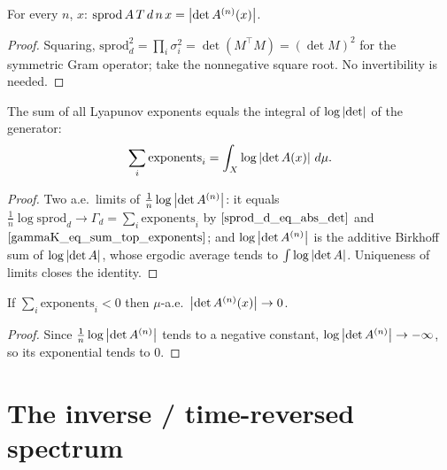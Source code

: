 \begin{lemma}\label{sprod_d_eq_abs_det}
  \leanok
  For every $n$, $x$: $\mathrm{sprod}\,A\,T\,d\,n\,x = \left\lvert \det A^{(n)}(x) \right\rvert$.
\end{lemma}
\begin{proof}\leanok
  Squaring, $\mathrm{sprod}_d^2 = \prod_i \sigma_i^2 = \det(M^{\top} M) = (\det M)^2$ for the symmetric Gram operator; take the nonnegative square root. No invertibility is needed.
\end{proof}

\begin{theorem}\label{sumAllExp_eq_integral_log_abs_det}
  \leanok
  The sum of all Lyapunov exponents equals the integral of $\log\left\lvert \det \right\rvert$ of the generator:
  \[ \sum_i \mathrm{exponents}_i = \int_X \log\left\lvert \det A(x) \right\rvert\,d\mu. \]
\end{theorem}
\begin{proof}\leanok
  Two a.e.\ limits of $\tfrac1n\log\left\lvert \det A^{(n)} \right\rvert$: it equals $\tfrac1n\log\mathrm{sprod}_d \to \Gamma_d = \sum_i\mathrm{exponents}_i$ by $\ref{sprod_d_eq_abs_det}$ and $\ref{gammaK_eq_sum_top_exponents}$; and $\log\left\lvert \det A^{(n)} \right\rvert$ is the additive Birkhoff sum of $\log\left\lvert \det A \right\rvert$, whose ergodic average tends to $\int\log\left\lvert \det A \right\rvert$. Uniqueness of limits closes the identity.
\end{proof}

\begin{corollary}\label{tendsto_abs_det_cocycle_atTop_zero}
  \leanok
  If $\sum_i \mathrm{exponents}_i < 0$ then $\mu$-a.e.\ $\left\lvert \det A^{(n)}(x) \right\rvert \to 0$.
\end{corollary}
\begin{proof}\leanok
  Since $\tfrac1n\log\left\lvert \det A^{(n)} \right\rvert$ tends to a negative constant, $\log\left\lvert \det A^{(n)} \right\rvert \to -\infty$, so its exponential tends to $0$.
\end{proof}

\section{The inverse / time-reversed spectrum}

